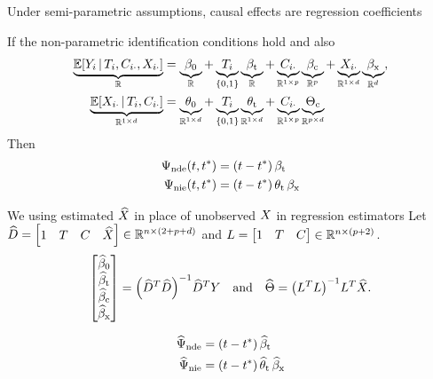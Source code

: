 \documentclass[aspectratio=169]{beamer}
\theoremstyle{remark}
\begin{document}
\begin{frame}{Under semi-parametric assumptions, causal effects are regression coefficients}

    If the non-parametric identification conditions hold and also
    \begin{equation*}
        \begin{aligned}
            \underbrace{\E[T_i, \C_{i \cdot}, \X_{i \cdot}]{Y_i}}_{\R}
             & = \underbrace{\betazero}_{\R}
            + \underbrace{T_i}_{\{0, 1\}} \underbrace{\betat}_{\R}
            + \underbrace{\C_{i \cdot}}_{\R^{1 \times p}} \underbrace{\betac}_{\R^{p}}
            + \underbrace{\X_{i \cdot}}_{\R^{1 \times d}} \underbrace{\betax}_{\R^d}, \\
            \underbrace{\E[T_i, \C_{i \cdot}]{\X_{i \cdot}}}_{\R^{1 \times d}}
             & = \underbrace{\thetazero}_{\R^{1 \times d}}
            + \underbrace{T_i}_{\{0, 1\}} \underbrace{\thetat}_{\R^{1 \times d}}
            + \underbrace{\C_{i \cdot}}_{\R^{1 \times p}} \underbrace{\Thetac}_{\R^{p \times d}}
        \end{aligned}
    \end{equation*}
    Then
    \begin{align*}
        \ndef & = \paren*{t - t^*} \, \betat            \\
        \nief & = \paren*{t - t^*} \, \thetat \, \betax
    \end{align*}

\end{frame}

\begin{frame}{We using estimated $\widehat{X}$ in place of unobserved $X$ in regression estimators}
    Let $\widehat{D} = \begin{bmatrix} 1 & T & C  & \widehat{X} \end{bmatrix} \in \mathbb{R}^{n \times (2 + p + d)}$ and $L = \begin{bmatrix} 1 & T & C \end{bmatrix} \in \mathbb{R}^{n \times (p + 2)}$.
    \begin{equation*}
        \begin{bmatrix}
            \betazerohat \\
            \betathat    \\
            \betachat    \\
            \betaxhat
        \end{bmatrix}
        = \paren*{\Dhat^T \Dhat}^{-1} \Dhat^T Y
        \quad \text{and} \quad
        \Thetahat
        = \paren*{\Wfull^T \Wfull}^{-1} \Wfull^T \Xhat.
    \end{equation*}

    \begin{align*}
        \ndehat & = \paren*{t - t^*} \, \betathat               \\
        \niehat & = \paren*{t - t^*} \, \thetathat \, \betaxhat
    \end{align*}
\end{frame}
\end{document}
